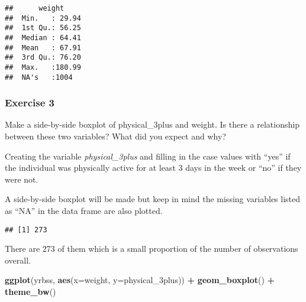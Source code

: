 \documentclass[
]{article}
\newenvironment{Shaded}{\begin{snugshade}}{\end{snugshade}}
\newcommand{\DataTypeTok}[1]{\textcolor[rgb]{0.13,0.29,0.53}{#1}}
\newcommand{\DecValTok}[1]{\textcolor[rgb]{0.00,0.00,0.81}{#1}}
\newcommand{\KeywordTok}[1]{\textcolor[rgb]{0.13,0.29,0.53}{\textbf{#1}}}
\newcommand{\NormalTok}[1]{#1}
\newcommand{\OperatorTok}[1]{\textcolor[rgb]{0.81,0.36,0.00}{\textbf{#1}}}
\newcommand{\StringTok}[1]{\textcolor[rgb]{0.31,0.60,0.02}{#1}}
\begin{document}
\begin{verbatim}
##      weight      
##  Min.   : 29.94  
##  1st Qu.: 56.25  
##  Median : 64.41  
##  Mean   : 67.91  
##  3rd Qu.: 76.20  
##  Max.   :180.99  
##  NA's   :1004
\end{verbatim}

\hypertarget{exercise-3}{%
\subsubsection{Exercise 3}\label{exercise-3}}

Make a side-by-side boxplot of physical\_3plus and weight. Is there a
relationship between these two variables? What did you expect and why?

Creating the variable \emph{physical\_3plus} and filling in the case
values with ``yes'' if the individual was physically active for at least
3 days in the week or ``no'' if they were not.

\begin{Shaded}
\end{Shaded}

A side-by-side boxplot will be made but keep in mind the missing
variables listed as ``NA'' in the data frame are also plotted.

\begin{Shaded}
\end{Shaded}

\begin{verbatim}
## [1] 273
\end{verbatim}

There are 273 of them which is a small proportion of the number of
observations overall.

\begin{Shaded}
\begin{Highlighting}[]
\KeywordTok{ggplot}\NormalTok{(yrbss, }\KeywordTok{aes}\NormalTok{(}\DataTypeTok{x=}\NormalTok{weight, }\DataTypeTok{y=}\NormalTok{physical_3plus)) }\OperatorTok{+}\StringTok{ }\KeywordTok{geom_boxplot}\NormalTok{() }\OperatorTok{+}\StringTok{ }\KeywordTok{theme_bw}\NormalTok{()}
\end{Highlighting}
\end{Shaded}
\end{document}
